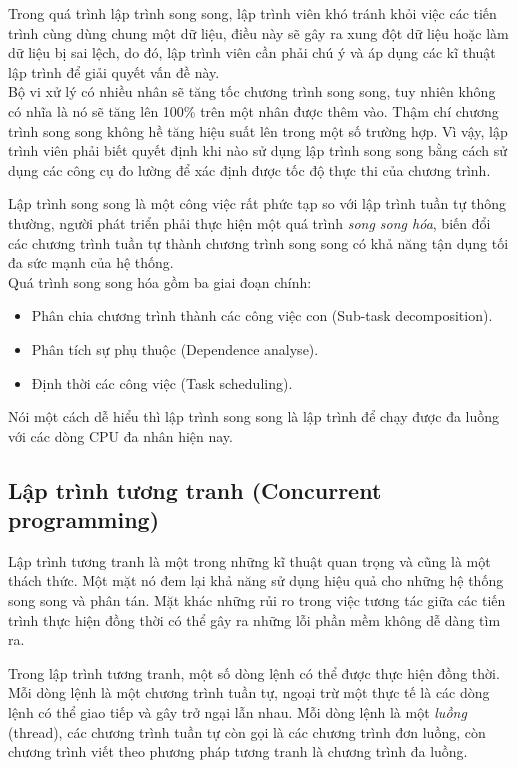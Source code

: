 \documentclass[10pt, a4paper]{article}
\begin{document}
Trong quá trình lập trình song song, lập trình viên khó tránh khỏi việc các tiến trình cùng dùng chung một dữ liệu, điều này sẽ gây ra xung đột dữ liệu hoặc làm dữ liệu bị sai lệch, do đó, lập trình viên cần phải chú ý và áp dụng các kĩ thuật lập trình để giải quyết vấn đề này.\\

Bộ vi xử lý có nhiều nhân sẽ tăng tốc chương trình song song, tuy nhiên không có nhĩa là nó sẽ tăng lên 100\% trên một nhân được thêm vào. Thậm chí chương trình song song không hề tăng hiệu suất lên trong một số trường hợp. Vì vậy, lập trình viên phải biết quyết định khi nào sử dụng lập trình song song bằng cách sử dụng các công cụ đo lường để xác định được tốc độ thực thi của chương trình.

Lập trình song song là một công việc rất phức tạp so với lập trình tuần tự thông thường, người phát triển phải thực hiện một quá trình \emph{song song hóa}, biến đổi các chương trình tuần tự thành chương trình song song có khả năng tận dụng tối đa sức mạnh của hệ thống.\\

Quá trình song song hóa gồm ba giai đoạn chính:
\begin{itemize}
\item Phân chia chương trình thành các công việc con (Sub-task decomposition).
\item Phân tích sự phụ thuộc (Dependence analyse).
\item Định thời các công việc (Task scheduling).
\end{itemize}
Nói một cách dễ hiểu thì lập trình song song là lập trình để chạy được đa luồng với các dòng CPU đa nhân hiện nay.

\subsection{Lập trình tương tranh (Concurrent programming)}
Lập trình tương tranh là một trong những kĩ thuật quan trọng và cũng là một thách thức. Một mặt nó đem lại khả năng sử dụng hiệu quả cho những hệ thống song song và phân tán. Mặt khác những rủi ro trong việc tương tác giữa các tiến trình thực hiện đồng thời có thể gây ra những lỗi phần mềm không dễ dàng tìm ra.

Trong lập trình tương tranh, một số dòng lệnh có thể được thực hiện đồng thời. Mỗi dòng lệnh là một chương trình  tuần tự, ngoại trừ một thực tế là các dòng lệnh có thể giao tiếp và gây trở ngại lẫn nhau. Mỗi dòng lệnh là một \emph{luồng} (thread), các chương trình tuần tự còn gọi là các chương trình đơn luồng, còn chương trình viết theo phương pháp tương tranh là chương trình đa luồng.\\
\end{document}

